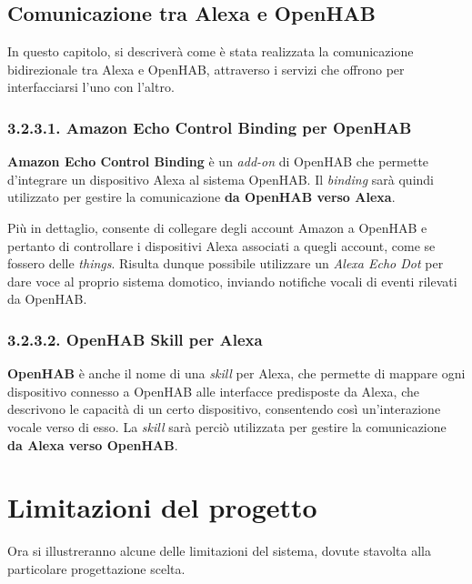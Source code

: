 \subsection{Comunicazione tra Alexa e OpenHAB}
\label{subsec:Sezione3.2.3}

In questo capitolo, si descriverà come è stata realizzata la comunicazione
bidirezionale tra Alexa e OpenHAB, attraverso i servizi che offrono per
interfacciarsi l’uno con l’altro.

\subsubsection{3.2.3.1. Amazon Echo Control Binding per OpenHAB}
\label{subsec:Sezione3.2.3.1}

\textbf{Amazon Echo Control Binding} \cite{BINDING_AECB} è un \textit{add-on}
di OpenHAB che permette d'integrare un dispositivo Alexa al sistema OpenHAB.
Il \textit{binding} sarà quindi utilizzato per gestire la comunicazione
\textbf{da OpenHAB verso Alexa}.

Più in dettaglio, consente di collegare degli account Amazon a OpenHAB e
pertanto di controllare i dispositivi Alexa associati a quegli account, come se
fossero delle \textit{things}. Risulta dunque possibile utilizzare un
\textit{Alexa Echo Dot} per dare voce al proprio sistema domotico, inviando
notifiche vocali di eventi rilevati da OpenHAB.

\subsubsection{3.2.3.2. OpenHAB Skill per Alexa}
\label{subsec:Sezione3.2.3.2}

\textbf{OpenHAB} \cite{OPENHAB_SKILL} è anche il nome di una \textit{skill} per
Alexa, che permette di mappare ogni dispositivo connesso a OpenHAB alle
interfacce predisposte da Alexa, che descrivono le capacità di un certo
dispositivo, consentendo così un’interazione vocale verso di esso. La
\textit{skill} sarà perciò utilizzata per gestire la comunicazione
\textbf{da Alexa verso OpenHAB}.

\section{Limitazioni del progetto}
\label{sec:Sezione3.3}

Ora si illustreranno alcune delle limitazioni del sistema, dovute stavolta alla
particolare progettazione scelta.

